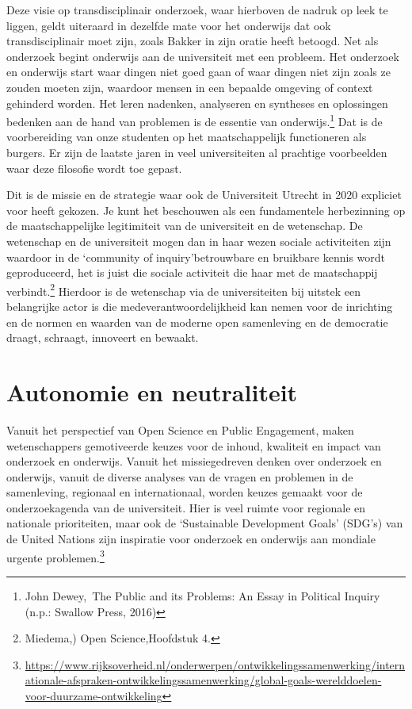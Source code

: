 \documentclass{jote-book}
\begin{document}
	Deze visie op transdisciplinair onderzoek, waar hierboven de nadruk op leek te liggen, geldt uiteraard in dezelfde mate voor het onderwijs dat ook transdisciplinair moet zijn, zoals Bakker in zijn oratie heeft betoogd. Net als onderzoek begint onderwijs aan de universiteit met een probleem. Het onderzoek en onderwijs start waar dingen niet goed gaan of waar dingen niet zijn zoals ze zouden moeten zijn, waardoor mensen in een bepaalde omgeving of context gehinderd worden. Het leren nadenken, analyseren en syntheses en oplossingen bedenken aan de hand van problemen is de essentie van onderwijs.\footnote{John Dewey, The Public and its Problems: An Essay in Political Inquiry (n.p.: Swallow Press, 2016)} Dat is de voorbereiding van onze studenten op het maatschappelijk functioneren als burgers. Er zijn de laatste jaren in veel universiteiten al prachtige voorbeelden waar deze filosofie wordt toe gepast.



	Dit is de missie en de strategie waar ook de Universiteit Utrecht in 2020 expliciet voor heeft gekozen. Je kunt het beschouwen als een fundamentele herbezinning op de maatschappelijke legitimiteit van de universiteit en de wetenschap. De wetenschap en de universiteit mogen dan in haar wezen sociale activiteiten zijn waardoor in de ‘community of inquiry'betrouwbare en bruikbare kennis wordt geproduceerd, het is juist die sociale activiteit die haar met de maatschappij verbindt.\footnote{Miedema,) Open Science,Hoofdstuk 4.} Hierdoor is de wetenschap via de universiteiten bij uitstek een belangrijke actor is die medeverantwoordelijkheid kan nemen voor de inrichting en de normen en waarden van de moderne open samenleving en de democratie draagt, schraagt, innoveert en bewaakt.



	\section{Autonomie en neutraliteit}



	Vanuit het perspectief van Open Science en Public Engagement, maken wetenschappers gemotiveerde keuzes voor de inhoud, kwaliteit en impact van onderzoek en onderwijs. Vanuit het missiegedreven denken over onderzoek en onderwijs, vanuit de diverse analyses van de vragen en problemen in de samenleving, regionaal en internationaal, worden keuzes gemaakt voor de onderzoekagenda van de universiteit. Hier is veel ruimte voor regionale en nationale prioriteiten, maar ook de ‘Sustainable Development Goals' (SDG's) van de United Nations zijn inspiratie voor onderzoek en onderwijs aan mondiale urgente problemen.\footnote{\href{about:blank}{https://www.rijksoverheid.nl/onderwerpen/ontwikkelingssamenwerking/internationale-afspraken-ontwikkelingssamenwerking/global-goals-werelddoelen-voor-duurzame-ontwikkeling}}
\end{document}
